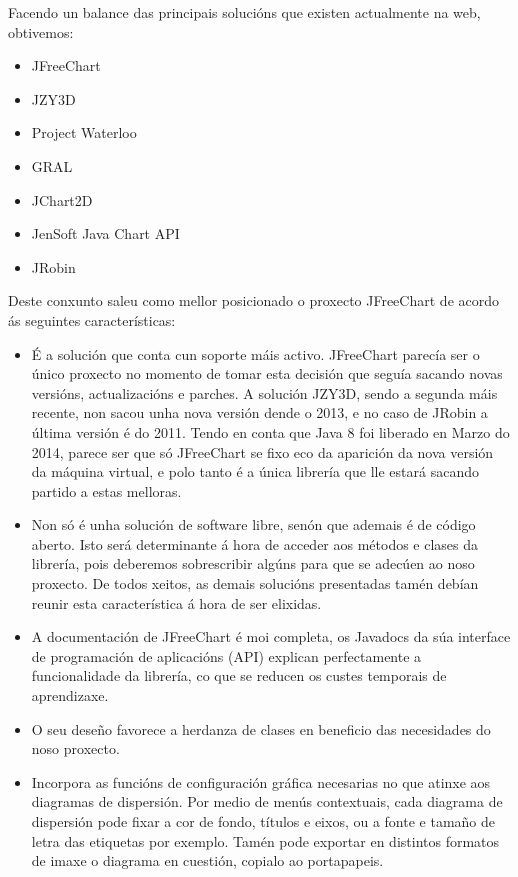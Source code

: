 Facendo un balance das principais solucións que existen actualmente na web, obtivemos:

\begin{itemize}
\item JFreeChart
\item JZY3D
\item Project Waterloo
\item GRAL
\item JChart2D
\item JenSoft Java Chart API
\item JRobin
\end{itemize} 

Deste conxunto saleu como mellor posicionado o proxecto JFreeChart \cite{jfreechart} de acordo ás seguintes características:

\begin{itemize}
\item É a solución que conta cun soporte máis activo. JFreeChart parecía ser o único proxecto no momento de tomar esta decisión que seguía sacando novas versións, actualizacións e parches. A solución JZY3D, sendo a segunda máis recente, non sacou unha nova versión dende o 2013, e no caso de JRobin a última versión é do 2011. Tendo en conta que Java 8 foi liberado en Marzo do 2014, parece ser que só JFreeChart se fixo eco da aparición da nova versión da máquina virtual, e polo tanto é a única librería que lle estará sacando partido a estas melloras.
\item Non só é unha solución de software libre, senón que ademais é de código aberto. Isto será determinante á hora de acceder aos métodos e clases da librería, pois deberemos sobrescribir algúns para que se adecúen ao noso proxecto. De todos xeitos, as demais solucións presentadas tamén debían reunir esta característica á hora de ser elixidas.
\item A documentación de JFreeChart é moi completa, os Javadocs da súa interface de programación de aplicacións (API) explican perfectamente a funcionalidade da librería, co que se reducen os custes temporais de aprendizaxe.
\item O seu deseño favorece a herdanza de clases en beneficio das necesidades do noso proxecto.
\item Incorpora as funcións de configuración gráfica necesarias no que atinxe aos diagramas de dispersión. Por medio de menús contextuais, cada diagrama de dispersión pode fixar a cor de fondo, títulos e eixos, ou a fonte e tamaño de letra das etiquetas por exemplo. Tamén pode exportar en distintos formatos de imaxe o diagrama en cuestión, copialo ao portapapeis.

\end{itemize}
